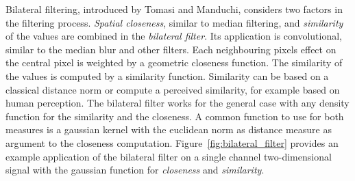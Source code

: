 Bilateral filtering, introduced by Tomasi and Manduchi\cite{tomasi_iccv98}, considers two factors in the filtering process.
\emph{Spatial closeness}, similar to median filtering, and \emph{similarity} of the values are combined in the \emph{bilateral filter}.
Its application is convolutional, similar to the median blur and other filters.
Each neighbouring pixels effect on the central pixel is weighted by a geometric closeness function.
The similarity of the values is computed by a similarity function.
Similarity can be based on a classical distance norm or compute a perceived similarity, for example based on human perception.
The bilateral filter works for the general case with any density function for the similarity and the closeness.
A common function to use for both measures is a gaussian kernel with the euclidean norm as distance measure as argument to the closeness computation.
Figure~\ref{fig:bilateral_filter} provides an example application of the bilateral filter on a single channel two-dimensional signal with the gaussian function for \emph{closeness} and \emph{similarity}.
